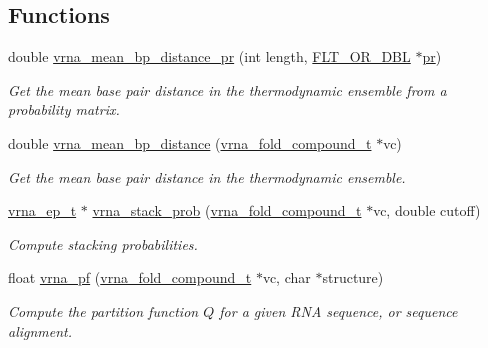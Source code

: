 \subsection*{Functions}
\begin{DoxyCompactItemize}
\item 
double \mbox{\hyperlink{group__pf__fold_gad3f0c240512e6d43e2e4d4c2076021f5}{vrna\+\_\+mean\+\_\+bp\+\_\+distance\+\_\+pr}} (int length, \mbox{\hyperlink{group__data__structures_ga31125aeace516926bf7f251f759b6126}{F\+L\+T\+\_\+\+O\+R\+\_\+\+D\+BL}} $\ast$\mbox{\hyperlink{fold__vars_8h_ac98ec419070aee6831b44e5c700f090f}{pr}})
\begin{DoxyCompactList}\small\item\em Get the mean base pair distance in the thermodynamic ensemble from a probability matrix. \end{DoxyCompactList}\item 
double \mbox{\hyperlink{group__pf__fold_gaa6b8983b559b9ef4b2e1b31113ea317b}{vrna\+\_\+mean\+\_\+bp\+\_\+distance}} (\mbox{\hyperlink{group__fold__compound_ga1b0cef17fd40466cef5968eaeeff6166}{vrna\+\_\+fold\+\_\+compound\+\_\+t}} $\ast$vc)
\begin{DoxyCompactList}\small\item\em Get the mean base pair distance in the thermodynamic ensemble. \end{DoxyCompactList}\item 
\mbox{\hyperlink{group__struct__utils_gab9ac98ab55ded9fb90043b024b915aca}{vrna\+\_\+ep\+\_\+t}} $\ast$ \mbox{\hyperlink{group__pf__fold_ga132664bf29fdc30bb5ea715491d1ab22}{vrna\+\_\+stack\+\_\+prob}} (\mbox{\hyperlink{group__fold__compound_ga1b0cef17fd40466cef5968eaeeff6166}{vrna\+\_\+fold\+\_\+compound\+\_\+t}} $\ast$vc, double cutoff)
\begin{DoxyCompactList}\small\item\em Compute stacking probabilities. \end{DoxyCompactList}\item 
float \mbox{\hyperlink{group__pf__fold_ga29e256d688ad221b78d37f427e0e99bc}{vrna\+\_\+pf}} (\mbox{\hyperlink{group__fold__compound_ga1b0cef17fd40466cef5968eaeeff6166}{vrna\+\_\+fold\+\_\+compound\+\_\+t}} $\ast$vc, char $\ast$structure)
\begin{DoxyCompactList}\small\item\em Compute the partition function $Q$ for a given R\+NA sequence, or sequence alignment. \end{DoxyCompactList}\item 

\end{DoxyCompactItemize}
